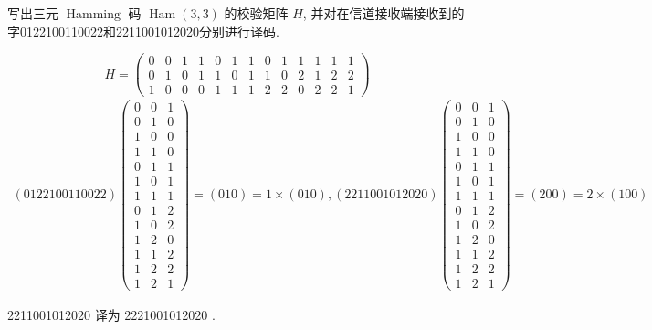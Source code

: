 \begin{exercise}
写出三元 $ \operatorname{Hamming} $ 码 $ \operatorname{Ham}(3,3) $ 的校验矩阵 $ H $, 并对在信道接收端接收到的字0122100110022和2211001012020分别进行译码.
\end{exercise}
\begin{solution}
$$ H=\left(\begin{array}{lllllllllllll}
0 & 0 & 1 & 1 & 0 & 1 & 1 & 0 & 1 & 1 & 1 & 1 & 1 \\
0 & 1 & 0 & 1 & 1 & 0 & 1 & 1 & 0 & 2 & 1 & 2 & 2 \\
1 & 0 & 0 & 0 & 1 & 1 & 1 & 2 & 2 & 0 & 2 & 2 & 1
\end{array}\right) $$
    $$
\begin{array}{l}
(0122100110022)\left(\begin{array}{lll}
0 & 0 & 1 \\
0 & 1 & 0 \\
1 & 0 & 0 \\
1 & 1 & 0 \\
0 & 1 & 1 \\
1 & 0 & 1 \\
1 & 1 & 1 \\
0 & 1 & 2 \\
1 & 0 & 2 \\
1 & 2 & 0 \\
1 & 1 & 2 \\
1 & 2 & 2 \\
1 & 2 & 1
\end{array}\right)=(010)=1 \times(010), (2211001012020)\left(\begin{array}{lll}
0 & 0 & 1 \\
0 & 1 & 0 \\
1 & 0 & 0 \\
1 & 1 & 0 \\
0 & 1 & 1 \\
1 & 0 & 1 \\
1 & 1 & 1 \\
0 & 1 & 2 \\
1 & 0 & 2 \\
1 & 2 & 0 \\
1 & 1 & 2 \\
1 & 2 & 2 \\
1 & 2 & 1
\end{array}\right)=(200)=2 \times(100)
\end{array}
$$

2211001012020 译为 2221001012020 .

\end{solution}

